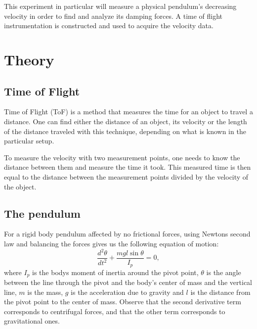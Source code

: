 \documentclass[11pt, a4paper]{article}
\begin{document}
This experiment in particular will measure a physical pendulum's decreasing velocity
in order to find and analyze its damping forces. A time of flight instrumentation
is constructed and used to acquire the velocity data.

\section{Theory}
\subsection{Time of Flight}
Time of Flight (ToF) is a method that measures the time for an object to travel a distance.
One can find either the distance of an object, its velocity or the length of the distance traveled with this technique, depending on what is known in the particular setup.

To measure the velocity with two measurement points, one needs to know the distance between them and measure the time it took.
This measured time is then equal to the distance between the measurement points divided by the velocity of the object.

\subsection{The pendulum}
For a rigid body pendulum affected by no frictional forces, using Newtons second law and balancing the
forces gives us the following
equation of motion:
\begin{equation}
  \frac{d^2\theta}{dt^2} + \frac{mgl\sin{\theta}}{I_p} = 0,
  \label{eq_of_motion}
\end{equation}
where $I_p$ is the bodys moment of inertia around the pivot point, $\theta$ is the
angle between the line through the pivot and the body's center of mass and the
vertical line, $m$ is the mass, $g$ is the acceleration due to gravity and
$l$ is the distance from the pivot point to the center of mass. 
Observe that the second derivative term corresponds to centrifugal forces, and
that the other term corresponds to gravitational ones.



\end{document}
